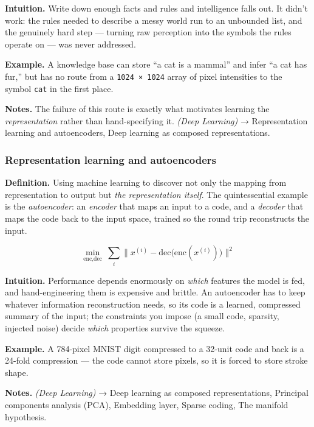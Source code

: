 \documentclass[
  10pt,
  letterpaper,
  onecolumn]{article}
\begin{document}
\textbf{Intuition.} Write down enough facts and rules and intelligence
falls out. It didn't work: the rules needed to describe a messy world
run to an unbounded list, and the genuinely hard step --- turning raw
perception into the symbols the rules operate on --- was never
addressed.

\textbf{Example.} A knowledge base can store ``a cat is a mammal'' and
infer ``a cat has fur,'' but has no route from a
\texttt{1024\ ×\ 1024} array of pixel intensities to the symbol
\texttt{cat} in the first place.

\textbf{Notes.} The failure of this route is exactly what motivates
learning the \emph{representation} rather than hand-specifying it.
\emph{(Deep Learning)} → Representation learning and autoencoders, Deep
learning as composed representations.

\hypertarget{representation-learning-and-autoencoders}{%
\subsubsection{Representation learning and
autoencoders}\label{representation-learning-and-autoencoders}}

\textbf{Definition.} Using machine learning to discover not only the
mapping from representation to output but \emph{the representation
itself}. The quintessential example is the \emph{autoencoder}: an
\emph{encoder} that maps an input to a code, and a \emph{decoder} that
maps the code back to the input space, trained so the round trip
reconstructs the input.

\begin{equation*}
\min_{\text{enc},\text{dec}}\ \sum_i \bigl\|x^{(i)}-\text{dec}\bigl(\text{enc}(x^{(i)})\bigr)\bigr\|^2
\end{equation*}

\textbf{Intuition.} Performance depends enormously on \emph{which}
features the model is fed, and hand-engineering them is expensive and
brittle. An autoencoder has to keep whatever information reconstruction
needs, so its code is a learned, compressed summary of the input; the
constraints you impose (a small code, sparsity, injected noise) decide
\emph{which} properties survive the squeeze.

\textbf{Example.} A 784-pixel MNIST digit compressed to a 32-unit code
and back is a 24-fold compression --- the code cannot store pixels, so
it is forced to store stroke shape.

\textbf{Notes.} \emph{(Deep Learning)} → Deep learning as composed
representations, Principal components analysis (PCA), Embedding layer,
Sparse coding, The manifold hypothesis.
\end{document}
